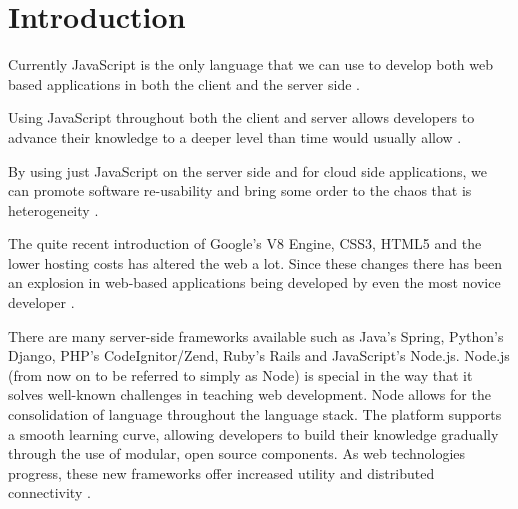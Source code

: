 \documentclass[12pt]{article} %
\begin{document}

\tableofcontents %

\newpage %


\section{Introduction} %
Currently JavaScript is the only language that we can use to develop both web based applications in both the client and the server side \cite{5}.

Using JavaScript throughout both the client and server allows developers to advance their knowledge to a deeper level than time would usually allow \cite{1}.

By using just JavaScript on the server side and for cloud side applications, we can promote software re-usability and bring some order to the chaos that is heterogeneity \cite{2}.

The quite recent introduction of Google's V8 Engine, CSS3, HTML5 and the lower hosting costs has altered the web a lot. Since these changes there has been an explosion in web-based applications being developed by even the most novice developer \cite{3}.

There are many server-side frameworks available such as Java's Spring, Python's Django, PHP's CodeIgnitor/Zend, Ruby's Rails and JavaScript's Node.js. Node.js (from now on to be referred to simply as Node) is special in the way that it solves well-known challenges in teaching web development. Node allows for the consolidation of language throughout the language stack. The platform supports a smooth learning curve, allowing developers to build their knowledge gradually through the use of modular, open source components. As web technologies progress, these new frameworks offer increased utility and distributed connectivity \cite{1}.
\end{document}
